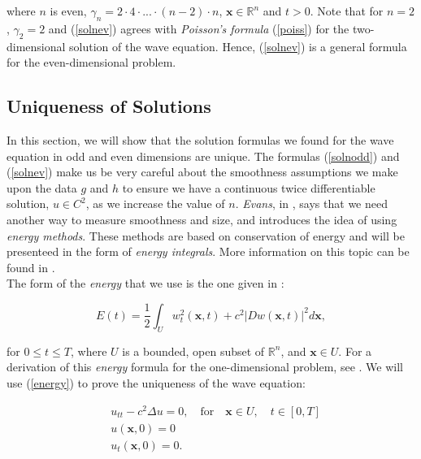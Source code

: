 \documentclass[a4paper, 12pt]{article}
\numberwithin{equation}{section}
\begin{document}
where $n$ is even, $\gamma_n=2 \cdot 4 \cdot ... \cdot(n-2) \cdot n$,
$\boldsymbol{x}\in \mathbb{R}^n$ and $t>0$. Note that for $n=2$, $\gamma_2 = 2$
and (\ref{solnev}) agrees with \emph{Poisson's formula} (\ref{poiss}) for the
two-dimensional solution of the wave equation. Hence, (\ref{solnev}) is a
general formula for the even-dimensional problem.


\subsection{Uniqueness of Solutions}
In this section, we will show that the solution formulas we found for the wave
equation in odd and even dimensions are unique. The formulas (\ref{solnodd}) and
(\ref{solnev}) make us be very careful about the smoothness assumptions we make
upon the data $g$ and $h$ to ensure we have a continuous twice differentiable
solution, $u \in C^2$, as we increase the value of $n$. \emph{Evans}, in
\cite{Ev}, says that we need another way to measure smoothness and size, and
introduces the idea of using \emph{energy methods}. These methods are based on
conservation of energy and will be presenteed in the form of \emph{energy
integrals}. More information on this topic can be found in \cite[Chapter VI,
Section 6]{Hil}. \\

The form of the \emph{energy} that we use is the one given in \cite{Ev}:

\begin{equation} \label{energy}
    E(t)=\frac{1}{2}\int_U w_t^2(\boldsymbol{x}, t)+c^2|Dw(\boldsymbol{x}, t)|^2d\boldsymbol{x},
\end{equation}

for $0 \le t \le T$, where $U$ is a bounded, open subset of $\mathbb{R}^n$, and
$\boldsymbol{x} \in U$. For a derivation of this \emph{energy} formula for the
one-dimensional problem, see \cite[Section 3.6.4]{Kev}. We will use
(\ref{energy}) to prove the uniqueness of the wave equation:

\begin{equation} \label{f45}
    \begin{aligned}
        &u_{tt}-c^2\Delta u =0, \quad \textrm{for} \quad \boldsymbol{x} \in U, \quad t \in [0,T]\\
        &u(\boldsymbol{x}, 0)=0\\
        &u_t(\boldsymbol{x}, 0)=0.
    \end{aligned}
\end{equation}
\end{document}
